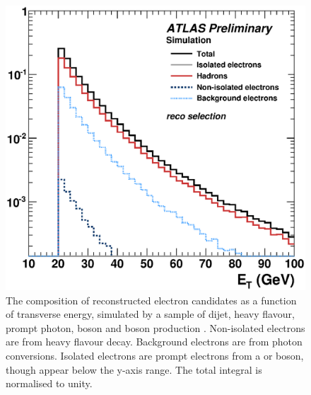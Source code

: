 \begin{figure}[p]
	\includegraphics[width=\mediumfigwidth]{tex/selection/electron_composition}
	\caption{The composition of reconstructed electron candidates as a function of 
	transverse energy, simulated by a  sample of dijet, heavy flavour, prompt 
	photon, \PW boson and \PZ boson production \cite{ElectronPerf:Expect}. Non-isolated 
	electrons are from heavy flavour decay. Background electrons are from photon 
	conversions. Isolated electrons are prompt electrons from a \PW or \PZ boson, though 
	appear below the y-axis range. The total integral is normalised to unity.}
	\label{fig:objects:el_composition}
\end{figure}

